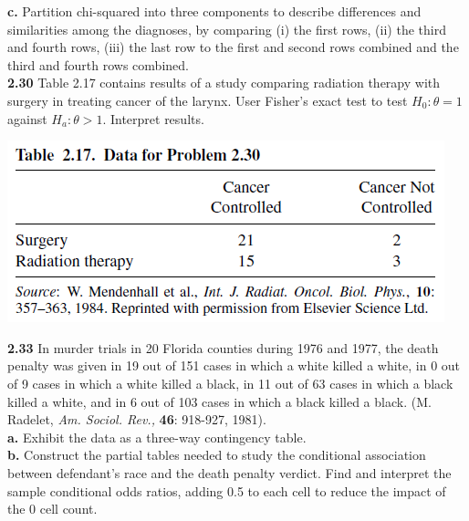 \documentclass[paper=letter, fontsize=11pt]{scrartcl} %
\begin{document}
\textbf{c.} Partition chi-squared into three components to describe differences and
similarities among the diagnoses, by comparing (i) the first rows, (ii) the third and
fourth rows, (iii) the last row to the first and second rows combined and the third
and fourth rows combined. \\

\textbf{2.30} Table 2.17 contains results of a study comparing radiation therapy with
surgery in treating cancer of the larynx. User Fisher's exact test to test $H_0: \theta =
1$ against $H_a: \theta > 1$. Interpret results. \\

\begin{center}
	\includegraphics[scale=.80]{table217.png}
\end{center}

\textbf{2.33} In murder trials in 20 Florida counties during 1976 and 1977, the death penalty was given in 19 out of 151 cases in which a white killed a white, in 0 out of 9 cases in 
which a white killed a black, in 11 out of 63 cases in which a black killed a white, and 
in 6 out of 103 cases in which a black killed a black. (M. Radelet, \textit{Am. Sociol. 
Rev.,} \textbf{46}: 918-927, 1981). \\

\textbf{a.} Exhibit the data as a three-way contingency table. \\

\textbf{b.} Construct the partial tables needed to study the conditional association 
between defendant's race and the death penalty verdict. Find and interpret the sample
conditional odds ratios, adding 0.5 to each cell to reduce the impact of the 0 cell count.
\\
\end{document}
